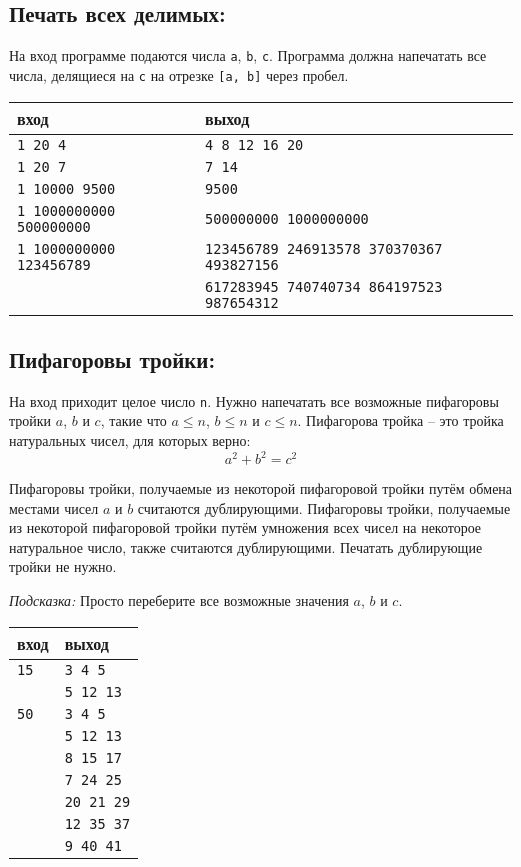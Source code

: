 \documentclass{article}
\begin{document}
\subsection{Печать всех делимых:}
На вход программе подаются числа \texttt{a}, \texttt{b}, \texttt{c}. Программа должна напечатать все числа, делящиеся на \texttt{c} на отрезке \texttt{[a, b]} через пробел.

\begin{center}
\begin{tabular}{ l l }
 вход & выход \\ \hline
 \texttt{1 20 4}  & \texttt{4 8 12 16 20}  \\ 
 \texttt{1 20 7} &  \texttt{7 14}  \\ 
 \texttt{1 10000 9500} & \texttt{9500}  \\ 
 \texttt{1 1000000000 500000000} & \texttt{500000000 1000000000} \\
 \texttt{1 1000000000 123456789} & \texttt{123456789 246913578 370370367 493827156}  \\ 
                                 & \texttt{617283945 740740734 864197523 987654312}  \\   
\end{tabular}
\end{center}


\subsection{Пифагоровы тройки:}
На вход приходит целое число \texttt{n}. Нужно напечатать все возможные пифагоровы тройки $a$, $b$ и $c$, такие что $a \le n$, $b \le n$ и $c \le n$. Пифагорова тройка -- это тройка натуральных чисел, для которых верно:
$$
a^2 + b^2 = c^2
$$

Пифагоровы тройки, получаемые из некоторой пифагоровой тройки путём обмена местами чисел $a$ и $b$ считаются дублирующими. Пифагоровы тройки, получаемые из некоторой пифагоровой тройки путём умножения всех чисел на некоторое натуральное число, также считаются дублирующими. Печатать дублирующие тройки не нужно.

\textit{Подсказка:} Просто переберите все возможные значения $a$, $b$ и $c$.

\begin{center}
\begin{tabular}{ l l }
 вход & выход \\ \hline
 \texttt{15}  & \texttt{3 4 5}  \\ 
              & \texttt{5 12 13}  \\ 
 \texttt{50}  & \texttt{3 4 5}  \\
              & \texttt{5 12 13}  \\ 
              & \texttt{8 15 17}  \\ 
              & \texttt{7 24 25}  \\ 
              & \texttt{20 21 29}  \\ 
              & \texttt{12 35 37}  \\ 
              & \texttt{9 40 41} 
\end{tabular}
\end{center}
\end{document}
